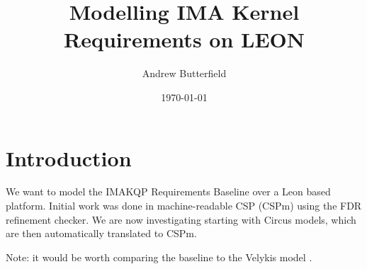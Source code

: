 \documentclass[11pt,a4paper,fleqn]{article}
\author{Andrew Butterfield}
\title{Modelling IMA Kernel Requirements on LEON}
\date\today
\begin{document}
\maketitle
\tableofcontents

\section{Introduction}

We want to model the IMAKQP Requirements Baseline\cite{IMAKQP-D02}
over a Leon based platform.
Initial work \cite{KH:2016,Costelloe17} was done in machine-readable CSP (CSPm)
using the FDR refinement checker\cite{fdr,fdrmanual}.
We are now investigating starting with Circus models\cite{OCW2007},
which are then automatically translated to CSPm.

Note: it would be worth comparing the baseline to the Velykis model \cite{VF10}.

\appendix

\newpage

% 
% 

\newpage


\end{document}

